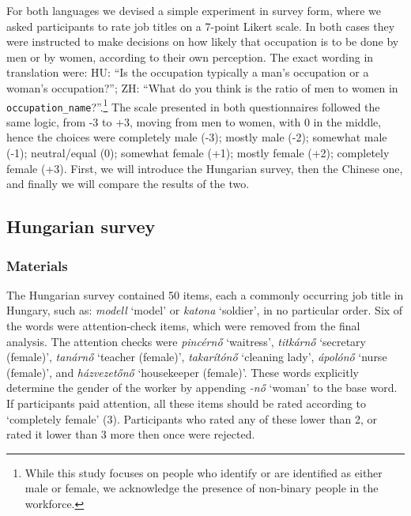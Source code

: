 \documentclass[11pt]{article}
\begin{document}
For both languages we devised a simple experiment in survey form, where we asked participants to rate job titles on a 7-point Likert scale. In both cases they were instructed to make decisions on how likely that occupation is to be done by men or by women, according to their own perception. The exact wording in translation were: HU: ``Is the occupation typically a man's occupation or a woman's occupation?''; ZH: ``What do you think is the ratio of men to women in \texttt{occupation\_name}?''.\footnote{While this study focuses on people who identify or are identified as either male or female, we acknowledge the presence of non-binary people in the workforce.} The scale presented in both questionnaires followed the same logic, from -3 to +3, moving from men to women, with 0 in the middle, hence the choices were completely male (-3); mostly male (-2); somewhat male (-1); neutral/equal (0); somewhat female (+1); mostly female (+2); completely female (+3). First, we will introduce the Hungarian survey, then the Chinese one, and finally we will compare the results of the two.

\subsection{Hungarian survey}

\subsubsection{Materials}

The Hungarian survey contained 50 items, each a commonly occurring job title in Hungary, such as: \textit{modell} `model' or \textit{katona} `soldier', in no particular order. Six of the words were attention-check items, which were removed from the final analysis. The attention checks were \textit{pincérnő} `waitress', \textit{titkárnő} `secretary (female)', \textit{tanárnő} `teacher (female)', \textit{takarítónő} `cleaning lady', \textit{ápolónő} `nurse (female)', and \textit{házvezetőnő} `housekeeper (female)'. These words explicitly determine the gender of the worker by appending \textit{-nő} `woman' to the base word. If participants paid attention, all these items should be rated according to `completely female' (3). Participants who rated any of these lower than 2, or rated it lower than 3 more then once were rejected. 
\end{document}
